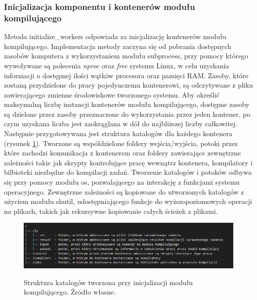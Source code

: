 \subsubsection{Inicjalizacja komponentu i kontenerów modułu kompilującego}
Metoda initialize\_workers odpowiada za inicjalizację kontenerów modułu kompilującego. Implementacja metody zaczyna się od pobrania dostępnych zasobów komputera z wykorzystaniem modułu subprocess\cite{pythonSubprocess}, przy pomocy którego wywoływane są polecenia \textit{nproc}\cite{linuxNproc} oraz \textit{free}\cite{linuxFree} systemu Linux, w celu uzyskania informacji o dostępnej ilości wątków procesora oraz pamięci RAM. Zasoby, które zostaną przydzielone do pracy pojedynczemu kontenerowi, są odczytywane z pliku zawierającego zmienne środowiskowe tworzonego systemu. Aby określić maksymalną liczbę instancji kontenerów modułu kompilującego, dostępne zasoby są dzielone przez zasoby przeznaczone do wykorzystania przez jeden kontener, po czym uzyskana liczba jest zaokrąglana w dół do najbliższej liczby całkowitej. Następnie przygotowywana jest struktura katalogów dla każdego kontenera (rysunek \ref{fig:scheduler-directory-structure}). Tworzone są współdzielone foldery wejścia/wyjścia, potoki przez które zachodzi komunikacja z kontenerem oraz foldery zawierające zewnętrzne zależności takie jak skrypty kontrolujące pracę wewnątrz kontenera, kompilatory i bilbioteki niezbędne do kompilacji zadań. Tworzenie katalogów i potoków odbywa się przy pomocy modułu os\cite{pytohnOs}, pozwalającego na interakcję z funkcjami systemu operacyjnego. Zewnętrzne zależności są kopiowane do utworzonych katalogów z użyciem modułu shutil\cite{pythonShutil}, udostępniającego funkcje do wyższopoziomowych operacji na plikach, takich jak rekursywne kopiowanie całych ścieżek z plikami.
\begin{figure}[!ht]
	\begin{center}
		\resizebox{1\textwidth}{!} {
			\includegraphics{img/3/orkiestrator-kontenerow-struktura-katalogow.png}
		}
		\caption{Struktura katalogów tworzona przy inicjalizacji modułu kompilującego. Źródło własne.}
		\label{fig:scheduler-directory-structure}
	\end{center}
\end{figure}
